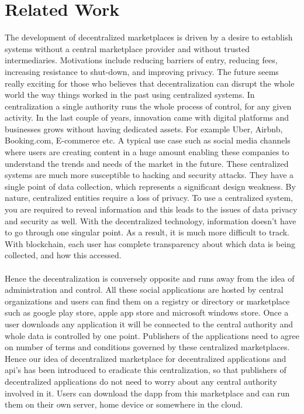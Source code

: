 \chapter{Related Work}
\label{cha:relatedwork}

The development of decentralized marketplaces is driven by a desire to establish systems without a central marketplace provider and without trusted intermediaries. Motivations include reducing barriers of entry, reducing fees, increasing resistance to shut-down, and improving privacy. The future seems really exciting for those who believes that decentralization can disrupt the whole world the way things worked in the past using centralized systems. In centralization a single authority runs the whole process of control, for any given activity. In the last couple of years, innovation came with digital platforms and businesses grows without having dedicated assets. For example Uber, Airbnb, Booking.com, E-commerce etc. A typical use case such as social media channels where users are creating content in a huge amount enabling these companies to understand the trends and needs of the market in the future. These centralized systems are much more susceptible to hacking and security attacks. They have a single point of data collection, which represents a significant design weakness. By nature, centralized entities require a loss of privacy. To use a centralized system, you are required to reveal information and this leads to the issues of data privacy and security as well. With the decentralized technology, information doesn’t have to go through one singular point. As a result, it is much more difficult to track. With blockchain, each user has complete transparency about which data is being collected, and how this accessed.
\\
\\
Hence the decentralization is conversely opposite and runs away from the idea of administration and control. All these social applications are hosted by central organizations and users can find them on a registry or directory or marketplace such as google play store, apple app store and microsoft windows store. Once a user downloads any application it will be connected to the central authority and whole data is controlled by one point. Publishers of the applications need to agree on number of terms and conditions governed by these centralized marketplaces. Hence our idea of decentralized marketplace for decentralized applications and api's has been introduced to eradicate this centralization, so that publishers of decentralized applications do not need to worry about any central authority involved in it. Users can download the dapp from this marketplace and can run them on their own server, home device or somewhere in the cloud.
